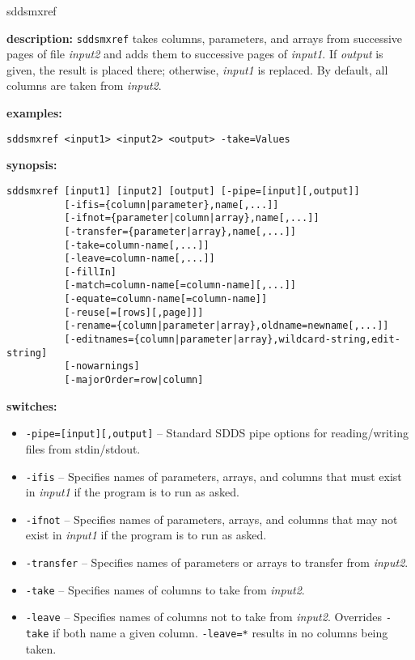 \begin{sddsprog}{sddsmxref}
  \item \textbf{description:} \verb|sddsmxref| takes columns, parameters, and arrays from successive pages of file \emph{input2} and adds them to successive pages of \emph{input1}. If \emph{output} is given, the result is placed there; otherwise, \emph{input1} is replaced. By default, all columns are taken from \emph{input2}.
  \item \textbf{examples:}
  \begin{verbatim}
sddsmxref <input1> <input2> <output> -take=Values
  \end{verbatim}
  \item \textbf{synopsis:}
  \begin{verbatim}
sddsmxref [input1] [input2] [output] [-pipe=[input][,output]]
          [-ifis={column|parameter},name[,...]]
          [-ifnot={parameter|column|array},name[,...]]
          [-transfer={parameter|array},name[,...]]
          [-take=column-name[,...]]
          [-leave=column-name[,...]]
          [-fillIn]
          [-match=column-name[=column-name][,...]]
          [-equate=column-name[=column-name]]
          [-reuse[=[rows][,page]]]
          [-rename={column|parameter|array},oldname=newname[,...]]
          [-editnames={column|parameter|array},wildcard-string,edit-string]
          [-nowarnings]
          [-majorOrder=row|column]
  \end{verbatim}
  \item \textbf{switches:}
  \begin{itemize}
    \item \verb|-pipe=[input][,output]| -- Standard SDDS pipe options for reading/writing files from stdin/stdout.
    \item \verb|-ifis| -- Specifies names of parameters, arrays, and columns that must exist in \emph{input1} if the program is to run as asked.
    \item \verb|-ifnot| -- Specifies names of parameters, arrays, and columns that may not exist in \emph{input1} if the program is to run as asked.
    \item \verb|-transfer| -- Specifies names of parameters or arrays to transfer from \emph{input2}.
    \item \verb|-take| -- Specifies names of columns to take from \emph{input2}.
    \item \verb|-leave| -- Specifies names of columns not to take from \emph{input2}. Overrides \verb|-take| if both name a given column. \verb|-leave=*| results in no columns being taken.

\end{itemize}
\end{sddsprog}
